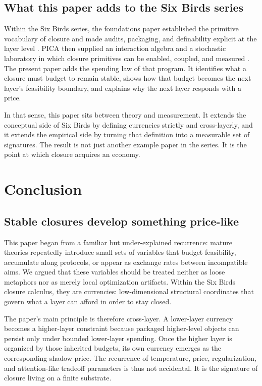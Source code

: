 \documentclass[11pt,a4paper]{article}
\begin{document}
\subsection{What this paper adds to the Six Birds series}

Within the Six Birds series, the foundations paper established the primitive vocabulary of closure and made audits, packaging, and definability explicit at the layer level \cite{tsiokos2026sixbirds}. PICA then supplied an interaction algebra and a stochastic laboratory in which closure primitives can be enabled, coupled, and measured \cite{tsiokos2026create}. The present paper adds the spending law of that program. It identifies what a closure must budget to remain stable, shows how that budget becomes the next layer's feasibility boundary, and explains why the next layer responds with a price.

In that sense, this paper sits between theory and measurement. It extends the conceptual side of Six Birds by defining currencies strictly and cross-layerly, and it extends the empirical side by turning that definition into a measurable set of signatures. The result is not just another example paper in the series. It is the point at which closure acquires an economy.
 \section{Conclusion}\label{sec:conclusion}

\subsection{Stable closures develop something price-like}

This paper began from a familiar but under-explained recurrence: mature theories repeatedly introduce small sets of variables that budget feasibility, accumulate along protocols, or appear as exchange rates between incompatible aims. We argued that these variables should be treated neither as loose metaphors nor as merely local optimization artifacts. Within the Six Birds closure calculus, they are currencies: low-dimensional structural coordinates that govern what a layer can afford in order to stay closed.

The paper's main principle is therefore cross-layer. A lower-layer currency becomes a higher-layer constraint because packaged higher-level objects can persist only under bounded lower-layer spending. Once the higher layer is organized by those inherited budgets, its own currency emerges as the corresponding shadow price. The recurrence of temperature, price, regularization, and attention-like tradeoff parameters is thus not accidental. It is the signature of closure living on a finite substrate.
\end{document}
